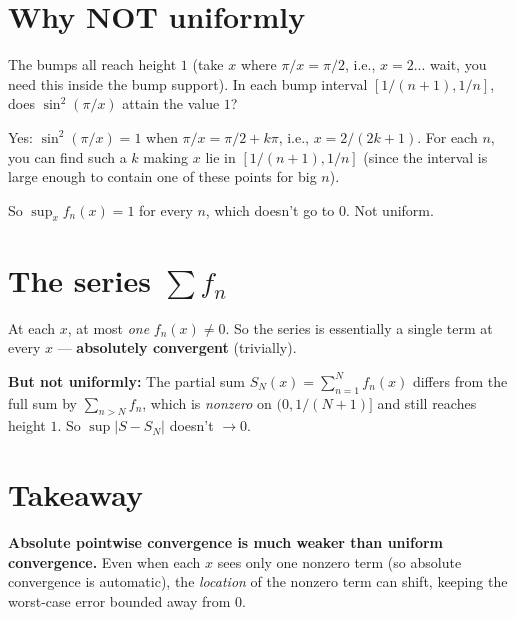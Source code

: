 \documentclass[12pt]{article}
\begin{document}
\section*{Why NOT uniformly}
The bumps all reach height $1$ (take $x$ where $\pi/x = \pi/2$, i.e., $x = 2$... wait, you need this inside the bump support). In each bump interval $[1/(n+1), 1/n]$, does $\sin^2(\pi/x)$ attain the value $1$?

Yes: $\sin^2(\pi/x) = 1$ when $\pi/x = \pi/2 + k\pi$, i.e., $x = 2/(2k+1)$. For each $n$, you can find such a $k$ making $x$ lie in $[1/(n+1), 1/n]$ (since the interval is large enough to contain one of these points for big $n$).

So $\sup_x f_n(x) = 1$ for every $n$, which doesn't go to $0$. Not uniform.

\section*{The series $\sum f_n$}
At each $x$, at most \emph{one} $f_n(x) \neq 0$. So the series is essentially a single term at every $x$ --- \textbf{absolutely convergent} (trivially).

\textbf{But not uniformly:} The partial sum $S_N(x) = \sum_{n=1}^{N} f_n(x)$ differs from the full sum by $\sum_{n > N} f_n$, which is \emph{nonzero} on $(0, 1/(N+1)]$ and still reaches height $1$. So $\sup |S - S_N|$ doesn't $\to 0$.

\section*{Takeaway}
\textbf{Absolute pointwise convergence is much weaker than uniform convergence.} Even when each $x$ sees only one nonzero term (so absolute convergence is automatic), the \emph{location} of the nonzero term can shift, keeping the worst-case error bounded away from $0$.
\end{document}

